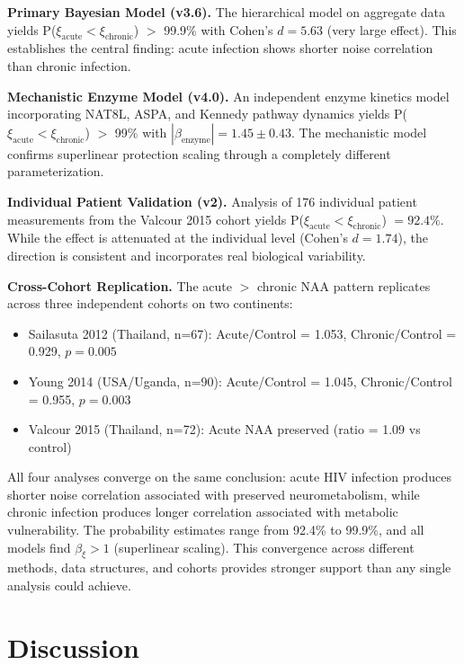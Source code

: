 \documentclass[10pt,a4paper]{article}
\begin{document}
\textbf{Primary Bayesian Model (v3.6).} The hierarchical model on aggregate data yields P($\xi_{\text{acute}} < \xi_{\text{chronic}}$) $>$ 99.9\% with Cohen's $d = 5.63$ (very large effect). This establishes the central finding: acute infection shows shorter noise correlation than chronic infection.

\textbf{Mechanistic Enzyme Model (v4.0).} An independent enzyme kinetics model incorporating NAT8L, ASPA, and Kennedy pathway dynamics yields P($\xi_{\text{acute}} < \xi_{\text{chronic}}$) $>$ 99\% with $|\beta_{\text{enzyme}}| = 1.45 \pm 0.43$. The mechanistic model confirms superlinear protection scaling through a completely different parameterization.

\textbf{Individual Patient Validation (v2).} Analysis of 176 individual patient measurements from the Valcour 2015 cohort yields P($\xi_{\text{acute}} < \xi_{\text{chronic}}$) $= 92.4\%$. While the effect is attenuated at the individual level (Cohen's $d = 1.74$), the direction is consistent and incorporates real biological variability.

\textbf{Cross-Cohort Replication.} The acute $>$ chronic NAA pattern replicates across three independent cohorts on two continents:
\begin{itemize}
\item Sailasuta 2012 (Thailand, n=67): Acute/Control = 1.053, Chronic/Control = 0.929, $p = 0.005$
\item Young 2014 (USA/Uganda, n=90): Acute/Control = 1.045, Chronic/Control = 0.955, $p = 0.003$
\item Valcour 2015 (Thailand, n=72): Acute NAA preserved (ratio = 1.09 vs control)
\end{itemize}

All four analyses converge on the same conclusion: acute HIV infection produces shorter noise correlation associated with preserved neurometabolism, while chronic infection produces longer correlation associated with metabolic vulnerability. The probability estimates range from 92.4\% to 99.9\%, and all models find $\beta_\xi > 1$ (superlinear scaling). This convergence across different methods, data structures, and cohorts provides stronger support than any single analysis could achieve.

\section{Discussion}
\end{document}
